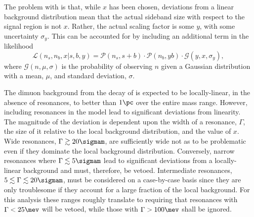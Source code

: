 The problem with  is that, while $x$ has been chosen, deviations from a linear
background distribution mean that the actual sideband size with respect to the signal region is not
$x$.
Rather, the actual scaling factor is some $y$, with some uncertainty $\sigma_y$.
This can be accounted for by including an additional term in the likelihood
\begin{equation}
  \mathcal{L}(n_s, n_b, x | s, b, y) =
  \mathcal{P}(n_s, s+b) \cdot
  \mathcal{P}(n_b, yb) \cdot
  \mathcal{G}(y,x,\sigma_y),
  \label{eq:db:like2}
\end{equation}
where $\mathcal{G}(n, \mu, \sigma)$ is the probability of observing $n$ given a Gaussian
distribution with a mean, $\mu$, and standard deviation, $\sigma$.

The dimuon background from the \sm decay of \btokstrmumu is expected to be locally-linear, in the
absence of resonances, to better than $1\pc$ over the entire mass range.
However, including resonances in the model lead to significant deviations from linearity.
The magnitude of the deviation is dependent upon the width of a resonance, $\Gamma$, the size of it
relative to the local background distribution, and the value of $x$.
Wide resonances, $\Gamma\gtrsim20\sigmam$, are sufficiently wide not as to be problematic even if
they dominate the local background distribution.
Conversely, narrow resonances where $\Gamma\lesssim5\sigmam$ lead to significant deviations from a
locally-linear background and must, therefore, be vetoed.
Intermediate resonances, $5\lesssim\Gamma\lesssim20\sigmam$, must be considered on a case-by-case
basis since they are only troublesome if they account for a large fraction of the local background.
For this analysis these ranges roughly translate to requiring that resonances with $\Gamma<25\mev$
will be vetoed, while those with $\Gamma>100\mev$ shall be ignored.

%























